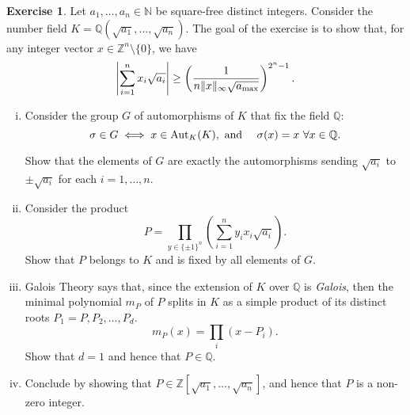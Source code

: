 \documentclass[12pt,a4paper]{article}
\theoremstyle{plain}
\newtheorem*{Sol*}{Solution}
\theoremstyle{definition}
\newtheorem{Ex}{Exercise}
\def \N {\mathbb N}
\def \Q {\mathbb Q}
\def \Z {\mathbb Z}
\newif\ifsolutions
\newcommand{\exercise}[2]{
			\begin{Ex} #1 \end{Ex}
			\ifsolutions  \begin{Sol*} #2 \end{Sol*} \bigskip \else \bigskip  \fi
		}
\begin{document}
\exercise{
	Let $a_1, \dots, a_n \in \N$ be square-free distinct integers. 
	Consider the number field $K = \Q(\sqrt{a_1}, \dots, \sqrt{a_n})$.
	The goal of the exercise is to show that, for any integer vector $x \in \Z^n \setminus \{ 0 \}$, we have
		\[ \left| \sum_{i=1}^n x_i \sqrt{a_i}  \right| \geq \left( \frac{1}{n \| x \|_\infty \sqrt{a_{\rm max}} } \right)^{2^n - 1}. \]

	\begin{enumerate}[i)]
		\item 
		Consider the group $G$ of automorphisms of $K$ that fix the field $\Q$:
			\[ \sigma \in G \iff x\in{\rm Aut}_K(K), \text{ and } \quad \sigma(x) = x \ \forall x \in \Q.\]

		Show that the elements of $G$ are exactly the automorphisms sending $\sqrt{a_i}$ to $\pm \sqrt{a_i}$ for each $i=1, \dots, n$.

		\item Consider the product 
			\[ P = \prod_{y \in \{ \pm 1\}^n} \left( \sum_{i=1}^n y_i x_i \sqrt{a_i} \right). \]
		Show that $P$ belongs to $K$ and is fixed by all elements of $G$.

		\item Galois Theory says  that, since the extension of $K$ over $\Q$ is \emph{Galois}, then the minimal polynomial $m_P$ of $P$ splits in $K$ as a simple product of its distinct roots $P_1=P, P_2, \dots, P_d$.
			\[ m_P(x) = \prod_i \left(x - P_i \right). \]
		Show that $d=1$ and hence that $P \in \Q$.

		\item Conclude by showing that $P \in \Z[\sqrt{a_1}, \dots, \sqrt{a_n}]$, and hence that $P$ is a non-zero integer.
	\end{enumerate}
}{
	\begin{enumerate}
		\item For each $\sigma \in G$ and each $i=1, \dots, n$, 
			\[ \sigma(\sqrt{a_i})^2 = \sigma(\sqrt{a_i}^2) = \sigma(a_i) = a_i. \]
		Hence $\sigma(\sqrt{a_i}) = \pm \sqrt{a_i}$.

		\item $P$ clearly belongs to $K$ since $K$ is a field.
		Furthermore, for each $\sigma \in G$, and since $\sigma$ only permutes the signs of the roots $\sqrt{a_1}, \dots, \sqrt{a_n}$, one has $\sigma(P) = \sigma$.

		\item Since the roots of $m_P$ are distinct, the automorphism $\pi : \Q(P,P_2) \rightarrow \Q(P,P_2)$ defined by $\pi(P) = P_2$ and extended to $K$ defines an automorphism of $G$ which does not send $P$ to itself.
		This cannot happen, and therefore $d=1$, $m_P(x) = x-P$ belongs to $\Q[x]$ and so does $P$.

		\item Since $\Z[\sqrt{a_1}, \dots, \sqrt{a_n}]$ is a ring, $P$ belongs to it. 
		By linear independence, $P$ is a nonzero integer, which gives in particular that
			\[ | P | \geq 1. \]
		Bounding from above the $2^n -1$ terms corresponding to $y \neq 1$ by
			\[ \left| \sum_{i=1}^n y_i x_i \sqrt{a_i} \right| \leq n \| x \|_\infty \sqrt{a_{\rm max}}, \]
		concludes.


	\end{enumerate}
}
\end{document}
